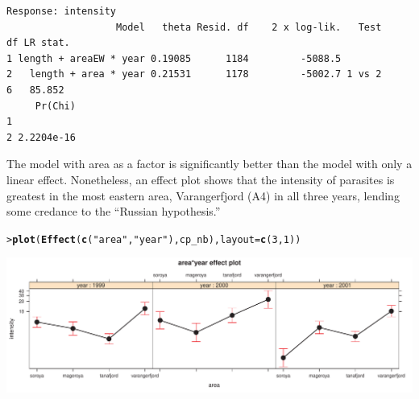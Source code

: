 \documentclass[10pt]{report}\usepackage[]{graphicx}\usepackage[]{color}
\makeatletter
\newcommand{\hlnum}[1]{\textcolor[rgb]{0.686,0.059,0.569}{#1}}%
\newcommand{\hlstr}[1]{\textcolor[rgb]{0.192,0.494,0.8}{#1}}%
\newcommand{\hlstd}[1]{\textcolor[rgb]{0.345,0.345,0.345}{#1}}%
\newcommand{\hlkwc}[1]{\textcolor[rgb]{0.333,0.667,0.333}{#1}}%
\newcommand{\hlkwd}[1]{\textcolor[rgb]{0.737,0.353,0.396}{\textbf{#1}}}%
\newenvironment{kframe}{%
 \def\at@end@of@kframe{}%
 \ifinner\ifhmode%
  \def\at@end@of@kframe{\end{minipage}}%
  \begin{minipage}{\columnwidth}%
 \fi\fi%
 \def\FrameCommand##1{\hskip\@totalleftmargin \hskip-\fboxsep
 \colorbox{shadecolor}{##1}\hskip-\fboxsep
     \hskip-\linewidth \hskip-\@totalleftmargin \hskip\columnwidth}%
 \MakeFramed {\advance\hsize-\width
   \@totalleftmargin\z@ \linewidth\hsize
   \@setminipage}}%
 {\par\unskip\endMakeFramed%
 \at@end@of@kframe}
\newenvironment{knitrout}{}{} %
\renewenvironment{knitrout}{\small\renewcommand{\baselinestretch}{.85}}{} %
\makeatother
\begin{document}
\begin{Exercises}
\begin{ans}
\begin{knitrout}
\begin{kframe}
\begin{verbatim}
Response: intensity
                   Model   theta Resid. df    2 x log-lik.   Test    df LR stat.
1 length + areaEW * year 0.19085      1184         -5088.5                      
2   length + area * year 0.21531      1178         -5002.7 1 vs 2     6   85.852
     Pr(Chi)
1           
2 2.2204e-16
\end{verbatim}
\end{kframe}
\end{knitrout}
  The model with area as a factor is significantly better than the model with only a linear
  effect.  Nonetheless, an effect plot shows that the intensity of parasites is greatest
  in the most eastern area, Varangerfjord (A4) in all three years, lending some credance
  to the ``Russian hypothesis.''
\begin{knitrout}\footnotesize
{}\color{fgcolor}\begin{kframe}
\begin{alltt}
\hlstd{> }\hlkwd{plot}\hlstd{(}\hlkwd{Effect}\hlstd{(}\hlkwd{c}\hlstd{(}\hlstr{"area"}\hlstd{,} \hlstr{"year"}\hlstd{), cp_nb),} \hlkwc{layout}\hlstd{=}\hlkwd{c}\hlstd{(}\hlnum{3}\hlstd{,}\hlnum{1}\hlstd{))}
\end{alltt}
\end{kframe}

\centerline{\includegraphics[width=.9\textwidth]{soln/fig/ex11_5c-1} }



\end{knitrout}
  \end{ans}
  


\end{Exercises}
\end{document}
